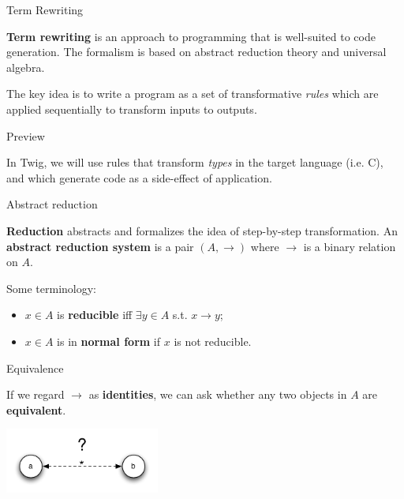 \documentclass{beamer}
\begin{document}
\begin{frame}{Term Rewriting}

\textbf{Term rewriting} is an approach to programming that is well-suited to
code generation. The formalism is based on abstract reduction theory and
universal algebra.

The key idea is to write a program as a set of transformative \emph{rules}
which are applied sequentially to transform inputs to outputs.

\end{frame}


\begin{frame}{Preview}

In Twig, we will use rules that transform \emph{types} in the target language
(i.e. C), and which generate code as a side-effect of application.

\end{frame}


\begin{frame}{Abstract reduction}

\textbf{Reduction} abstracts and formalizes the idea of step-by-step
transformation. An \textbf{abstract reduction system} is a pair $(A,\to)$
where $\to$ is a binary relation on $A$.

Some terminology:

\begin{itemize}
  \item $x \in A$ is \textbf{reducible} iff $\exists y \in A$ s.t. $ x \to y$;
  \item $x \in A$ is in \textbf{normal form} if $x$ is not reducible.
\end{itemize}

\end{frame}


\begin{frame}{Equivalence}

If we regard $\to$ as \textbf{identities}, we can ask whether any two objects
in $A$ are \textbf{equivalent}.

\begin{center}
\includegraphics[width=2in]{images/equivalence}
\end{center}

\end{frame}
\end{document}
